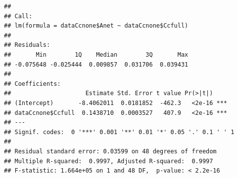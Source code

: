 \documentclass[
]{krantz}
\makeatletter
\newenvironment{Shaded}{\begin{snugshade}}{\end{snugshade}}
\newcommand{\CommentTok}[1]{\textcolor[rgb]{0.56,0.35,0.01}{\textit{#1}}}
\newcommand{\DecValTok}[1]{\textcolor[rgb]{0.00,0.00,0.81}{#1}}
\newcommand{\FunctionTok}[1]{\textcolor[rgb]{0.00,0.00,0.00}{#1}}
\newcommand{\NormalTok}[1]{#1}
\newcommand{\OtherTok}[1]{\textcolor[rgb]{0.56,0.35,0.01}{#1}}
\newcommand{\SpecialCharTok}[1]{\textcolor[rgb]{0.00,0.00,0.00}{#1}}
\newcommand{\StringTok}[1]{\textcolor[rgb]{0.31,0.60,0.02}{#1}}
\newenvironment{kframe}{%
\medskip{}
\setlength{\fboxsep}{.8em}
 \def\at@end@of@kframe{}%
 \ifinner\ifhmode%
  \def\at@end@of@kframe{\end{minipage}}%
  \begin{minipage}{\columnwidth}%
 \fi\fi%
 \def\FrameCommand##1{\hskip\@totalleftmargin \hskip-\fboxsep
 \colorbox{shadecolor}{##1}\hskip-\fboxsep
     \hskip-\linewidth \hskip-\@totalleftmargin \hskip\columnwidth}%
 \MakeFramed {\advance\hsize-\width
   \@totalleftmargin\z@ \linewidth\hsize
   \@setminipage}}%
 {\par\unskip\endMakeFramed%
 \at@end@of@kframe}
\renewenvironment{Shaded}{\begin{kframe}}{\end{kframe}}
\makeatother
\begin{document}
\begin{Shaded}
\end{Shaded}

\begin{verbatim}
## 
## Call:
## lm(formula = dataCcnone$Anet ~ dataCcnone$Ccfull)
## 
## Residuals:
##       Min        1Q    Median        3Q       Max 
## -0.075648 -0.025444  0.009857  0.031706  0.039431 
## 
## Coefficients:
##                     Estimate Std. Error t value Pr(>|t|)    
## (Intercept)       -8.4062011  0.0181852  -462.3   <2e-16 ***
## dataCcnone$Ccfull  0.1438710  0.0003527   407.9   <2e-16 ***
## ---
## Signif. codes:  0 '***' 0.001 '**' 0.01 '*' 0.05 '.' 0.1 ' ' 1
## 
## Residual standard error: 0.03599 on 48 degrees of freedom
## Multiple R-squared:  0.9997, Adjusted R-squared:  0.9997 
## F-statistic: 1.664e+05 on 1 and 48 DF,  p-value: < 2.2e-16
\end{verbatim}
\end{document}
